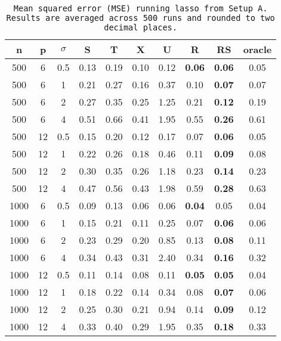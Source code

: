 \begin{table}[ht]
\centering
\begin{tabular}{cccccccccc}
  \hline
n & p & $\sigma$ & S & T & X & U & R & RS & oracle \\ 
  \hline
500 & 6 & 0.5 & 0.13 & 0.19 & 0.10 & 0.12 & \bf 0.06 & \bf 0.06 & 0.05 \\ 
  500 & 6 & 1 & 0.21 & 0.27 & 0.16 & 0.37 & 0.10 & \bf 0.07 & 0.07 \\ 
  500 & 6 & 2 & 0.27 & 0.35 & 0.25 & 1.25 & 0.21 & \bf 0.12 & 0.19 \\ 
  500 & 6 & 4 & 0.51 & 0.66 & 0.41 & 1.95 & 0.55 & \bf 0.26 & 0.61 \\ 
  500 & 12 & 0.5 & 0.15 & 0.20 & 0.12 & 0.17 & 0.07 & \bf 0.06 & 0.05 \\ 
  500 & 12 & 1 & 0.22 & 0.26 & 0.18 & 0.46 & 0.11 & \bf 0.09 & 0.08 \\ 
  500 & 12 & 2 & 0.30 & 0.35 & 0.26 & 1.18 & 0.23 & \bf 0.14 & 0.23 \\ 
  500 & 12 & 4 & 0.47 & 0.56 & 0.43 & 1.98 & 0.59 & \bf 0.28 & 0.63 \\ 
  1000 & 6 & 0.5 & 0.09 & 0.13 & 0.06 & 0.06 & \bf 0.04 & 0.05 & 0.04 \\ 
  1000 & 6 & 1 & 0.15 & 0.21 & 0.11 & 0.25 & 0.07 & \bf 0.06 & 0.06 \\ 
  1000 & 6 & 2 & 0.23 & 0.29 & 0.20 & 0.85 & 0.13 & \bf 0.08 & 0.11 \\ 
  1000 & 6 & 4 & 0.34 & 0.43 & 0.31 & 2.40 & 0.34 & \bf 0.16 & 0.32 \\ 
  1000 & 12 & 0.5 & 0.11 & 0.14 & 0.08 & 0.11 & \bf 0.05 & \bf 0.05 & 0.04 \\ 
  1000 & 12 & 1 & 0.18 & 0.22 & 0.14 & 0.34 & 0.08 & \bf 0.07 & 0.06 \\ 
  1000 & 12 & 2 & 0.25 & 0.30 & 0.21 & 0.94 & 0.14 & \bf 0.09 & 0.12 \\ 
  1000 & 12 & 4 & 0.33 & 0.40 & 0.29 & 1.95 & 0.35 & \bf 0.18 & 0.33 \\ 
   \hline
\end{tabular}
\caption{\tt Mean squared error (MSE) running \texttt{lasso} from Setup A. Results are averaged across 500 runs and rounded to two decimal places.} 
\label{table:setup1}
\end{table}

